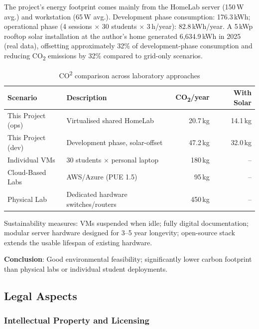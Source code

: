 The project's energy footprint comes mainly from the HomeLab server (150\,W avg.) and
workstation (65\,W avg.). Development phase consumption: 176.3\,kWh; operational phase
(4 sessions $\times$ 30 students $\times$ 3\,h/year): 82.8\,kWh/year. A 5\,kWp rooftop
solar installation at the author's home generated 6{,}634.9\,kWh in 2025 (real data),
offsetting approximately 32\% of development-phase consumption and reducing CO\textsubscript{2}
emissions by 32\% compared to grid-only scenarios\cite{red_electrica,murugesan2008}.

\begin{table}[H]
  \centering
  \small
  \setlength{\tabcolsep}{4pt}
  \renewcommand{\arraystretch}{1.1}
  \begin{tabularx}{\textwidth}{lXrr}
    \toprule
    \textbf{Scenario} & \textbf{Description} & \textbf{CO\textsubscript{2}/year} & \textbf{With Solar} \\
    \midrule
    This Project (ops)  & Virtualised shared HomeLab           & 20.7\,kg & 14.1\,kg \\
    This Project (dev)  & Development phase, solar-offset      & 47.2\,kg & 32.0\,kg \\
    Individual VMs      & 30 students $\times$ personal laptop & 180\,kg  & --       \\
    Cloud-Based Labs    & AWS/Azure (PUE 1.5)                  & 95\,kg   & --       \\
    Physical Lab        & Dedicated hardware switches/routers  & 450\,kg  & --       \\
    \bottomrule
  \end{tabularx}
  \caption[CO\textsuperscript{2} comparison]{CO\textsuperscript{2} comparison across laboratory approaches}
  \label{tab:co2_comparison}
\end{table}

Sustainability measures: VMs suspended when idle; fully digital documentation; modular server hardware designed for 3--5 year longevity;
open-source stack extends the usable lifespan of existing hardware.

\textbf{Conclusion}: Good environmental feasibility; significantly lower carbon footprint
than physical labs or individual student deployments.

\subsection{Legal Aspects}

\subsubsection{Intellectual Property and Licensing}


